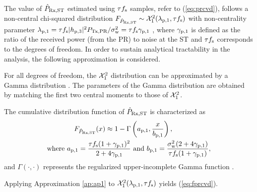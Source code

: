 The value of $\hat{P}_{\text{Rx,ST}}$ estimated using $\tau f_{\text{s}}$ samples, refer to (\ref{eq:prcvd}), follows a non-central chi-squared distribution $\fprcvd \sim \ncchi2(\lpo, \tau \fsam)$ with non-centrality parameter $\lambda_{\text{p,1}} = \tau f_{\text{s}} |h_{\text{p,3}}|^2 P_{\text{Tx,PR}} /\sigma^2_{\text{w}} = \tau f_{\text{s}} {\gamma}_{\text{p,1}}$ \cite{Kay}, where ${\gamma}_{\text{p,1}}$ is defined as the ratio of the received power (from the PR) to noise at the ST and $\tau f_{\text{s}}$ corresponds to the degrees of freedom. In order to sustain analytical tractability in the analysis, the following approximation is considered. 
\begin{approxi} \label{ap:ap1}
\normalfont
For all degrees of freedom, the $\ncchi2$ distribution can be approximated by a Gamma distribution \cite{abramo}. The parameters of the Gamma distribution are obtained by matching the first two central moments to those of $\ncchi2$.
\end{approxi}
\begin{lemma} \label{lm:lm1}
\normalfont
The cumulative distribution function of $\hat{P}_{\text{Rx,ST}}$ is characterized as 
\begin{align}
F_{\hat{P}_{\text{Rx,ST}}}(x) \approx 1 - \Gamma&\left(a_{\text{p,1}}, \frac{x}{b_{\text{p,1}}}\right) \label{eq:fprcvd}, \\ 
\text{where  } a_{\text{p,1}} = \frac{\tau f_{\text{s}} (1 + {\gamma}_{\text{p,1}})^2}{2 + 4 {\gamma}_{\text{p,1}}} &\text{ and } b_{\text{p,1}} = \frac{\sigma^2_{\text{w}} (2 + 4 {\gamma}_{\text{p,1}})}{\tau f_{\text{s}} (1 + {\gamma}_{\text{p,1}})},  \label{eq:para_po} 
\end{align} 
and $\Gamma(\cdot, \cdot)$ represents the regularized upper-incomplete Gamma function \cite{abramo}. 
\end{lemma}
\begin{IEEEproof}
Applying Approximation \ref{ap:ap1} to $\ncchi2(\lpo, \tau \fsam)$ yields (\ref{eq:fprcvd}). 
\end{IEEEproof}

